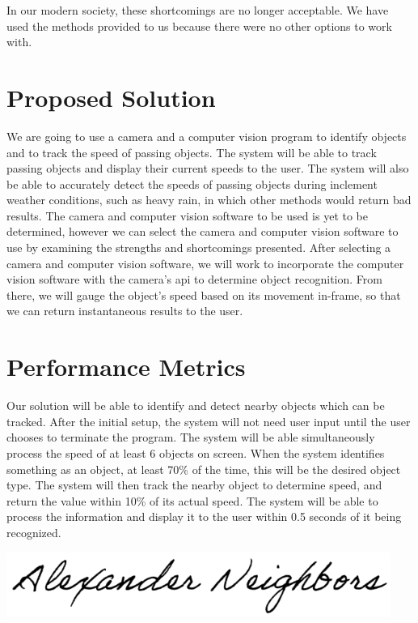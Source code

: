 \documentclass[letterpaper,10pt,onecolumn,draftclsnofoot]{IEEEtran}
\begin{document}
 In our modern society, these shortcomings are no longer acceptable.
 We have used the methods provided to us because there were no other options to work with.



\section{Proposed Solution}

We are going to use a camera and a computer vision program to identify objects and to track the speed of passing objects.
 The system will be able to track passing objects and display their current speeds to the user.
 The system will also be able to accurately detect the speeds of passing objects during inclement weather conditions, such as heavy rain, in which other methods would return bad results.
 The camera and computer vision software to be used is yet to be determined, however we can select the camera and computer vision software to use by examining the strengths and shortcomings presented.
 After selecting a camera and computer vision software, we will work to incorporate the computer vision software with the camera’s api to determine object recognition.
 From there, we will gauge the object’s speed based on its movement in-frame, so that we can return instantaneous results to the user.
 

\section{Performance Metrics}

Our solution will be able to identify and detect nearby objects which can be tracked.
After the initial setup, the system will not need user input until the user chooses to terminate the program.
The system will be able simultaneously process the speed of at least 6 objects on screen. 
When the system identifies something as an object, at least 70\% of the time, this will be the desired object type.
The system will then track the nearby object to determine speed, and return the value within 10\% of its actual speed.
The system will be able to process the information and display it to the user within 0.5 seconds of it being recognized.

 

\hfill \break

\hfill \break

\hfill \break



\includegraphics[scale=0.5]{signature}
\end{document}
